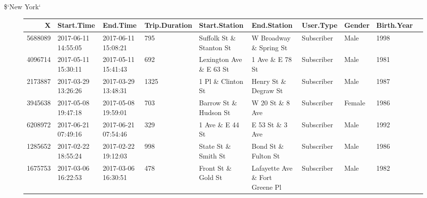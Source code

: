 \documentclass[11pt]{article}
\begin{document}
\begin{description}
\item[\$`New York`] \begin{tabular}{r|lllllllll}
 X & Start.Time & End.Time & Trip.Duration & Start.Station & End.Station & User.Type & Gender & Birth.Year\\
\hline
	 5688089                          & 2017-06-11 14:55:05              & 2017-06-11 15:08:21              &  795                             & Suffolk St \& Stanton St        & W Broadway \& Spring St         & Subscriber                       & Male                             & 1998                            \\
	 4096714                          & 2017-05-11 15:30:11              & 2017-05-11 15:41:43              &  692                             & Lexington Ave \& E 63 St        & 1 Ave \& E 78 St                & Subscriber                       & Male                             & 1981                            \\
	 2173887                          & 2017-03-29 13:26:26              & 2017-03-29 13:48:31              & 1325                             & 1 Pl \& Clinton St              & Henry St \& Degraw St           & Subscriber                       & Male                             & 1987                            \\
	 3945638                          & 2017-05-08 19:47:18              & 2017-05-08 19:59:01              &  703                             & Barrow St \& Hudson St          & W 20 St \& 8 Ave                & Subscriber                       & Female                           & 1986                            \\
	 6208972                          & 2017-06-21 07:49:16              & 2017-06-21 07:54:46              &  329                             & 1 Ave \& E 44 St                & E 53 St \& 3 Ave                & Subscriber                       & Male                             & 1992                            \\
	 1285652                          & 2017-02-22 18:55:24              & 2017-02-22 19:12:03              &  998                             & State St \& Smith St            & Bond St \& Fulton St            & Subscriber                       & Male                             & 1986                            \\
	 1675753                          & 2017-03-06 16:22:53              & 2017-03-06 16:30:51              &  478                             & Front St \& Gold St             & Lafayette Ave \& Fort Greene Pl & Subscriber                       & Male                             & 1982                            \\

\end{tabular}
\end{description}
\end{document}
